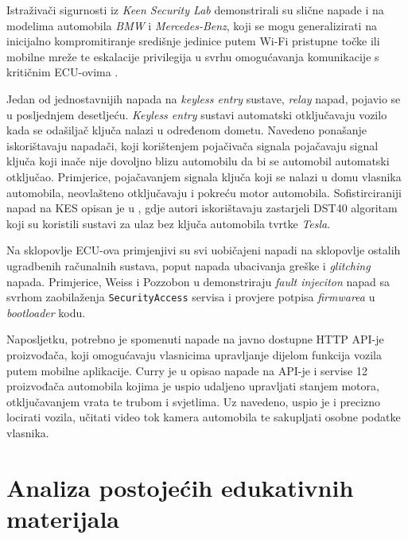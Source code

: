 \documentclass[times, utf8, diplomski, numeric]{fer}
\begin{document}
Istraživači sigurnosti iz \textit{Keen Security Lab} demonstrirali su slične napade i na modelima automobila \textit{BMW} i \textit{Mercedes-Benz}, koji se mogu generalizirati na inicijalno kompromitiranje središnje jedinice putem Wi-Fi pristupne točke ili mobilne mreže te eskalacije privilegija u svrhu omogućavanja komunikacije s kritičnim ECU-ovima \cite{tencent2018bmw, tencent2019bmw, tencent2019mercedes}. 

Jedan od jednostavnijih napada na \textit{keyless entry} sustave, \textit{relay} napad, pojavio se u posljednjem desetljeću\cite{wired2024kes}. \textit{Keyless entry} sustavi automatski otključavaju vozilo kada se odašiljač ključa nalazi u određenom dometu. Navedeno ponašanje iskorištavaju napadači, koji korištenjem pojačivača signala pojačavaju signal ključa koji inače nije dovoljno blizu automobilu da bi se automobil automatski otključao. Primjerice, pojačavanjem signala ključa koji se nalazi u domu vlasnika automobila, neovlašteno otključavaju i pokreću motor automobila. Sofistirciraniji napad na KES opisan je u \cite{wouters2019fast}, gdje autori iskorištavaju zastarjeli DST40 algoritam koji su koristili sustavi za ulaz bez ključa automobila tvrtke \textit{Tesla}.

Na sklopovlje ECU-ova primjenjivi su svi uobičajeni napadi na sklopovlje ostalih ugradbenih računalnih sustava, poput napada ubacivanja greške  i \textit{glitching} napada. Primjerice, Weiss i Pozzobon u \cite{weiss2022uds} demonstriraju \textit{fault injeciton} napad sa svrhom zaobilaženja \texttt{SecurityAccess} servisa i provjere potpisa \textit{firmwarea} u \textit{bootloader} kodu.

Naposljetku, potrebno je spomenuti napade na javno dostupne HTTP API-je proizvođača, koji omogućavaju vlasnicima upravljanje dijelom funkcija vozila putem mobilne aplikacije. Curry je u \cite{curry2023web} opisao napade na API-je i servise 12 proizvođača automobila kojima je uspio udaljeno upravljati stanjem motora, otključavanjem vrata te trubom i svjetlima. Uz navedeno, uspio je i precizno locirati vozila, učitati video tok kamera automobila te sakupljati osobne podatke vlasnika.   

\chapter{Analiza postojećih edukativnih materijala}
\end{document}
